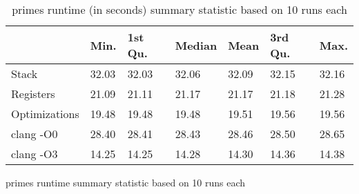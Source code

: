 \begin{table}[h!]
\centering
\begin{tabular}{p{}p{}p{}p{}p{}p{}p{}}
  \hline
 & Min. & 1st Qu. & Median & Mean & 3rd Qu. & Max. \\ 
  \hline
Stack & 32.03 & 32.03 & 32.06 & 32.09 & 32.15 & 32.16 \\ 
  Registers & 21.09 & 21.11 & 21.17 & 21.17 & 21.18 & 21.28 \\ 
  Optimizations & 19.48 & 19.48 & 19.48 & 19.51 & 19.56 & 19.56 \\ 
  clang -O0 & 28.40 & 28.41 & 28.43 & 28.46 & 28.50 & 28.65 \\ 
  clang -O3 & 14.25 & 14.25 & 14.28 & 14.30 & 14.36 & 14.38 \\ 
   \hline
\end{tabular}
\caption{primes runtime summary statistic based on 10 runs each}
\caption{primes runtime (in seconds) summary statistic based on 10 runs each}
\end{table}
